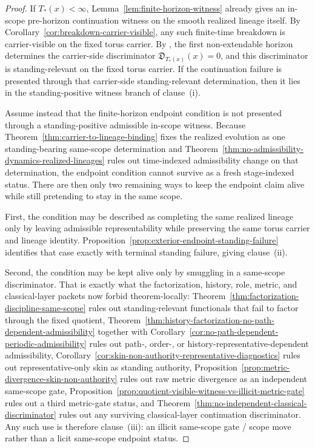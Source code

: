 \begin{proof}
If $T_*(x)<\infty$, Lemma~\ref{lem:finite-horizon-witness} already gives an in-scope pre-horizon continuation witness on the smooth realized lineage itself. By Corollary~\ref{cor:breakdown-carrier-visible}, any such finite-time breakdown is carrier-visible on the fixed torus carrier. By \HorizonDetectabilityRef{}, the first non-extendable horizon determines the carrier-side discriminator $\mathfrak D_{T_*(x)}(x)=0$, and this discriminator is standing-relevant on the fixed torus carrier. If the continuation failure is presented through that carrier-side standing-relevant determination, then it lies in the standing-positive witness branch of clause~(i).

Assume instead that the finite-horizon endpoint condition is not presented through a standing-positive admissible in-scope witness. Because Theorem~\ref{thm:carrier-to-lineage-binding} fixes the realized evolution as one standing-bearing same-scope determination and Theorem~\ref{thm:no-admissibility-dynamics-realized-lineages} rules out time-indexed admissibility change on that determination, the endpoint condition cannot survive as a fresh stage-indexed status. There are then only two remaining ways to keep the endpoint claim alive while still pretending to stay in the same scope.

First, the condition may be described as completing the same realized lineage only by leaving admissible representability while preserving the same torus carrier and lineage identity. Proposition~\ref{prop:exterior-endpoint-standing-failure} identifies that case exactly with terminal standing failure, giving clause~(ii).

Second, the condition may be kept alive only by smuggling in a same-scope discriminator. That is exactly what the factorization, history, role, metric, and classical-layer packets now forbid theorem-locally: Theorem~\ref{thm:factorization-discipline-same-scope} rules out standing-relevant functionals that fail to factor through the fixed quotient, Theorem~\ref{thm:history-factorization-no-path-dependent-admissibility} together with Corollary~\ref{cor:no-path-dependent-periodic-admissibility} rules out path-, order-, or history-representative-dependent admissibility, Corollary~\ref{cor:skin-non-authority-representative-diagnostics} rules out representative-only skin as standing authority, Proposition~\ref{prop:metric-divergence-skin-non-authority} rules out raw metric divergence as an independent same-scope gate, Proposition~\ref{prop:quotient-visible-witness-vs-illicit-metric-gate} rules out a third metric-gate status, and Theorem~\ref{thm:no-independent-classical-discriminator} rules out any surviving classical-layer continuation discriminator. Any such use is therefore clause~(iii): an illicit same-scope gate / scope move rather than a licit same-scope endpoint status.


\end{proof}

